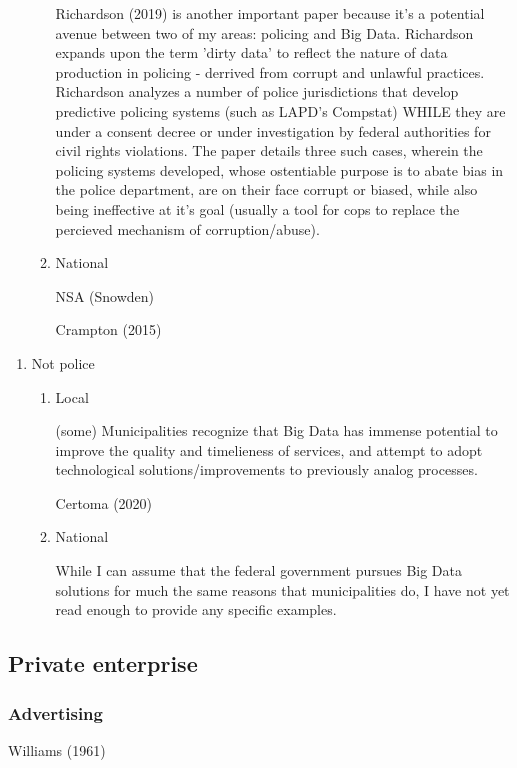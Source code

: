\begin{enumerate}
\begin{enumerate}
Richardson (2019) is another important paper because it's a potential
avenue between two of my areas: policing and Big Data. Richardson
expands upon the term 'dirty data' to reflect the nature of data
production in policing - derrived from corrupt and unlawful
practices. Richardson analyzes a number of police jurisdictions that
develop predictive policing systems (such as LAPD's Compstat) WHILE
they are under a consent decree or under investigation by federal
authorities for civil rights violations. The paper details three such
cases, wherein the policing systems developed, whose ostentiable
purpose is to abate bias in the police department, are on their face
corrupt or biased, while also being ineffective at it's goal (usually
a tool for cops to replace the percieved mechanism of
corruption/abuse).

\item National

  NSA (Snowden)

  Crampton (2015)

\end{enumerate}
\end{enumerate}

\begin{enumerate}
\item Not police
  
\begin{enumerate}
\item Local

(some) Municipalities recognize that Big Data has immense potential to
  improve the quality and timelieness of services, and attempt to
  adopt technological solutions/improvements to previously analog
  processes.

Certoma (2020)

\item National

While I can assume that the federal government pursues Big Data
solutions for much the same reasons that municipalities do, I have not
yet read enough to provide any specific examples.
  
\end{enumerate}
\end{enumerate}

\subsection{Private enterprise}
\subsubsection{Advertising}

Williams (1961)
